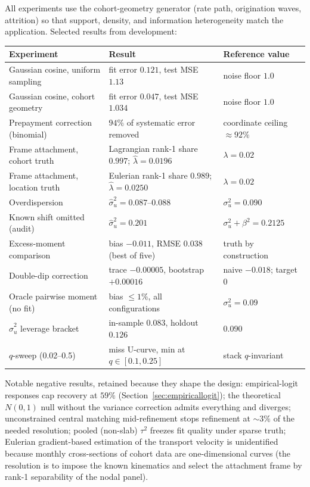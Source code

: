 \documentclass[11pt]{article}
\begin{document}
All experiments use the cohort-geometry generator (rate path, origination waves,
attrition) so that support, density, and information heterogeneity match the
application. Selected results from development:

\begin{center}
\begin{tabularx}{\textwidth}{@{}p{}X p{}@{}}
\toprule
Experiment & Result & Reference value\\
\midrule
Gaussian cosine, uniform sampling & fit error $0.121$, test MSE $1.13$ & noise floor $1.0$\\
Gaussian cosine, cohort geometry & fit error $0.047$, test MSE $1.034$ & noise floor $1.0$\\
Prepayment correction (binomial) & $94\%$ of systematic error removed & coordinate ceiling $\approx 92\%$\\
Frame attachment, cohort truth & Lagrangian rank-1 share $0.997$; $\hat\lambda=0.0196$ & $\lambda=0.02$\\
Frame attachment, location truth & Eulerian rank-1 share $0.989$; $\hat\lambda=0.0250$ & $\lambda=0.02$\\
Overdispersion & $\hat\sigma_u^2=0.087$--$0.088$ & $\sigma_u^2=0.090$\\
Known shift omitted (audit) & $\hat\sigma_u^2=0.201$ & $\sigma_u^2+\beta^2=0.2125$\\
Excess-moment comparison & bias $-0.011$, RMSE $0.038$ (best of five) & truth by construction\\
Double-dip correction & trace $-0.00005$, bootstrap $+0.00016$ & naive $-0.018$; target $0$\\
Oracle pairwise moment (no fit) & bias $\le 1\%$, all configurations & $\sigma_u^2=0.09$\\
$\hat\sigma_u^2$ leverage bracket & in-sample $0.083$, holdout $0.126$ & $0.090$\\
$q$-sweep (0.02--0.5) & miss U-curve, min at $q\in[0.1,0.25]$ & stack $q$-invariant\\
\bottomrule
\end{tabularx}
\end{center}

Notable negative results, retained because they shape the design: empirical-logit
responses cap recovery at $59\%$ (Section~\ref{sec:empiricallogit}); the theoretical
$N(0,1)$ null without the variance correction admits everything and diverges;
unconstrained central matching mid-refinement stops refinement at $\sim 3\%$ of the
needed resolution; pooled (non-slab) $\tau^2$ freezes fit quality under sparse truth;
Eulerian gradient-based estimation of the transport velocity is unidentified because
monthly cross-sections of cohort data are one-dimensional curves (the resolution is to
impose the known kinematics and select the attachment frame by rank-1 separability of
the nodal panel).
\end{document}
